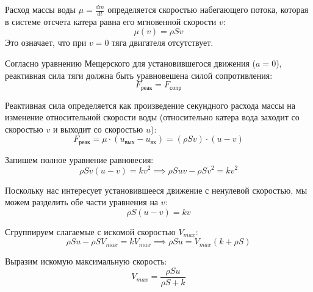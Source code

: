\begin{center}
\end{center}

Расход массы воды $\mu = \frac{dm}{dt}$ определяется скоростью набегающего потока, которая в системе отсчета катера равна его мгновенной скорости $v$:
\[
    \mu(v) = \rho S v
\]
Это означает, что при $v = 0$ тяга двигателя отсутствует.

Согласно уравнению Мещерского для установившегося движения ($a = 0$), реактивная сила тяги должна быть уравновешена силой сопротивления:
\[ F_{\text{реак}} = F_{\text{сопр}} \]

Реактивная сила определяется как произведение секундного расхода массы на изменение относительной скорости воды (относительно катера вода заходит со скоростью $v$ и выходит со скоростью $u$):
\[ F_{\text{реак}} = \mu \cdot (u_{\text{вых}} - u_{\text{вх}}) = (\rho S v) \cdot (u - v) \]

Запишем полное уравнение равновесия:
\[
    \rho S v (u - v) = k v^2\implies \rho S u v - \rho S v^2 = k v^2
\]

Поскольку нас интересует установившееся движение с ненулевой скоростью, мы можем разделить обе части уравнения на $v$:
\[ \rho S (u - v) = k v \]

Сгруппируем слагаемые с искомой скоростью $V_{max}$:
\[ \rho S u - \rho S V_{max} = k V_{max}\implies \rho S u = V_{max} (k + \rho S) \]

Выразим искомую максимальную скорость:
\[
    \boxed{V_{max} = \frac{\rho S u}{\rho S + k}}
\]